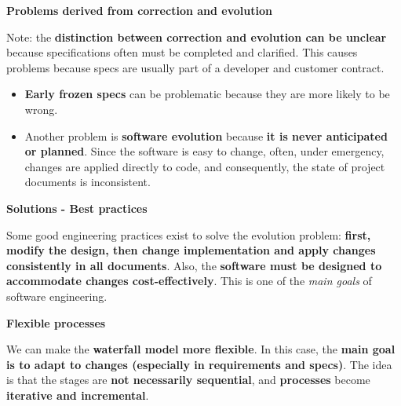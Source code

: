 \begin{flushleft}
    \textcolor{Red2}{\textbf{ Problems derived from correction and evolution}}
\end{flushleft}
Note: the \textbf{distinction between correction and evolution can be unclear} because specifications often must be completed and clarified. This causes problems because specs are usually part of a developer and customer contract. 
\begin{itemize}
    \item \textbf{Early frozen specs} can be problematic because they are more likely to be wrong.
    \item Another problem is \textbf{software evolution} because \textbf{it is never anticipated or planned}. Since the software is easy to change, often, under emergency, changes are applied directly to code, and consequently, the state of project documents is inconsistent.
\end{itemize}

\begin{flushleft}
    \textcolor{Green3}{ \textbf{Solutions - Best practices}}
\end{flushleft}
Some good engineering practices exist to solve the evolution problem: \textbf{first, modify the design, then change implementation and apply changes consistently in all documents}. Also, the \textbf{software must be designed to accommodate changes cost-effectively}. This is one of the \emph{main goals} of software engineering.

\begin{flushleft}
    \textcolor{Green3}{ \textbf{Flexible processes}}
\end{flushleft}
We can make the \textbf{waterfall model more flexible}. In this case, the \textbf{main goal is to adapt to changes (especially in requirements and specs)}.
The idea is that the stages are \textbf{not necessarily sequential}, and \textbf{processes} become \textbf{iterative and incremental}.